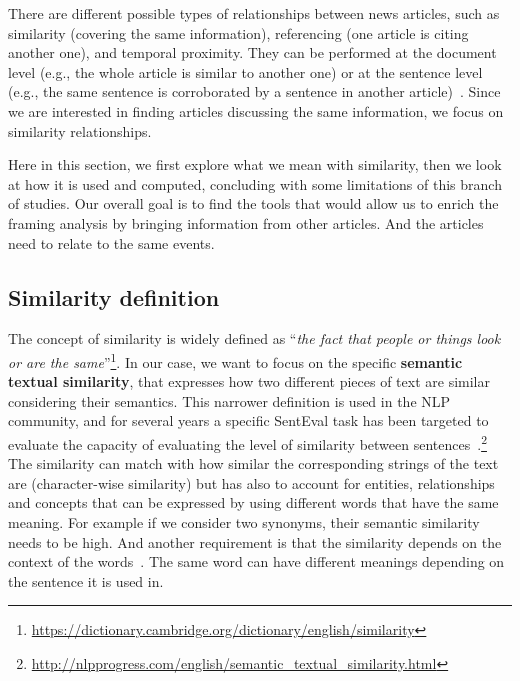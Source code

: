 There are different possible types of relationships between news articles, such as similarity (covering the same information), referencing (one article is citing another one), and temporal proximity. They can be performed at the document level (e.g., the whole article is similar to another one) or at the sentence level (e.g., the same sentence is corroborated by a sentence in another article)~\cite{bountouridis2018explaining}. %
Since we are interested in finding articles discussing the same information, we focus on similarity relationships.

Here in this section, we first explore what we mean with similarity, then we look at how it is used and computed, concluding with some limitations of this branch of studies.
Our overall goal is to find the tools that would allow us to enrich the framing analysis by bringing information from other articles. And the articles need to relate to the same events.

\subsection{Similarity definition}

The concept of similarity is widely defined as ``\emph{the fact that people or things look or are the same}''\footnote{\url{https://dictionary.cambridge.org/dictionary/english/similarity}}. In our case, we want to focus on the specific \textbf{semantic textual similarity}, that expresses how two different pieces of text are similar considering their semantics.
This narrower definition is used in the NLP community, and for several years a specific SentEval task has been targeted to evaluate the capacity of evaluating the level of similarity between sentences~\cite{conneau-kiela-2018-senteval}.\footnote{\url{http://nlpprogress.com/english/semantic\_textual\_similarity.html}}
The similarity can match with how similar the corresponding strings of the text are (character-wise similarity) but has also to account for entities, relationships and concepts that can be expressed by using different words that have the same meaning.
For example if we consider two synonyms, their semantic similarity needs to be high. 
And another requirement is that the similarity depends on the context of the words~\cite{miller1991contextual}. The same word can have different meanings depending on the sentence it is used in.

